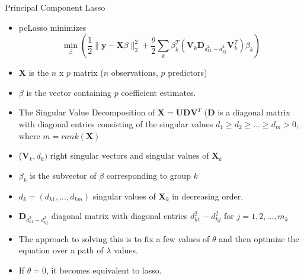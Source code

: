 \documentclass[8pt]{beamer}
\begin{document}
\begin{frame}{Principal Component Lasso}
\begin{itemize}
    \item pcLasso minimizes 
    \[
    \min\limits_{\beta}
    (\frac{1}{2} \| \mathbf{y}-\mathbf{X}\beta\|_2^2 + \frac{\theta}{2}
    \sum\limits_k \beta_k^T
    (\mathbf{V}_k \mathbf{D}_{d^2_{k1}-d^2_{kj}} \mathbf{V}^T_k)\beta_k)
    \]
    \item $\mathbf{X}$ is the $n$ x $p$ matrix ($n$ observations, $p$ predictors)
    
    \item $\beta$ is the vector containing $p$ coefficient estimates.
    
    \item The Singular Value Decomposition of $\mathbf{X=UDV}^{T}$ ($\mathbf{D}$ is a diagonal matrix with diagonal entries consisting of the singular values $d_{1}\geq d_{2}\geq ... \geq d_{m} >0$, where $m=rank(\mathbf{X})$
    
    \item ($\mathbf{V}_k, d_k)$ right singular vectors and singular values of $\mathbf{X}_k$
    
    \item $\beta_k$ is the subvector of $\beta$ corresponding to group $k$
    \item $d_k = (d_{k1},...,d_{km})$ singular values of $\mathbf{X}_k$ in decreasing order.
    \item $\mathbf{D}_{d^2_{k1}-d^2_{kj}}$ diagonal matrix with diagonal entries ${d^2_{k1}-d^2_{kj}}$ for $j=1,2,...,m_k$
    \item The approach to solving this is to fix a few values of $\theta$ and then optimize the equation over a path of $\lambda$ values.
    \item If $\theta = 0$, it becomes equivalent to lasso. 
\end{itemize}
\end{frame}
\end{document}

